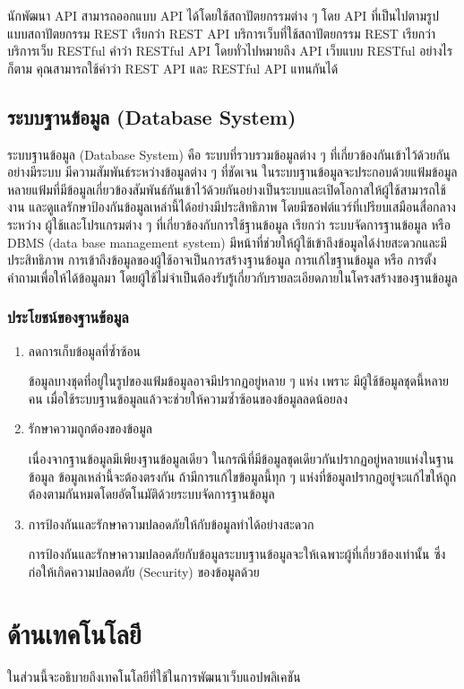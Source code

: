 นักพัฒนา API สามารถออกแบบ API ได้โดยใช้สถาปัตยกรรมต่าง ๆ โดย API ที่เป็นไปตามรูปแบบสถาปัตยกรรม REST เรียกว่า REST API บริการเว็บที่ใช้สถาปัตยกรรม REST เรียกว่าบริการเว็บ RESTful คำว่า RESTful API โดยทั่วไปหมายถึง API เว็บแบบ RESTful อย่างไรก็ตาม คุณสามารถใช้คำว่า REST API และ RESTful API แทนกันได้
\subsection{ระบบฐานข้อมูล (Database System)}
ระบบฐานข้อมูล (Database System) \cite{web:database} คือ ระบบที่รวบรวมข้อมูลต่าง ๆ ที่เกี่ยวข้องกันเข้าไว้ด้วยกันอย่างมีระบบ มีความสัมพันธ์ระหว่างข้อมูลต่าง ๆ ที่ชัดเจน ในระบบฐานข้อมูลจะประกอบด้วยแฟ้มข้อมูลหลายแฟ้มที่มีข้อมูลเกี่ยวข้องสัมพันธ์กันเข้าไว้ด้วยกันอย่างเป็นระบบและเปิดโอกาสให้ผู้ใช้สามารถใช้งาน
และดูแลรักษาป้องกันข้อมูลเหล่านี้ได้อย่างมีประสิทธิภาพ โดยมีซอฟต์แวร์ที่เปรียบเสมือนสื่อกลางระหว่าง
ผู้ใช้และโปรแกรมต่าง ๆ ที่เกี่ยวข้องกับการใช้ฐานข้อมูล เรียกว่า ระบบจัดการฐานข้อมูล หรือ DBMS (data base management system) มีหน้าที่ช่วยให้ผู้ใช้เข้าถึงข้อมูลได้ง่ายสะดวกและมีประสิทธิภาพ การเข้าถึงข้อมูลของผู้ใช้อาจเป็นการสร้างฐานข้อมูล การแก้ไขฐานข้อมูล หรือ การตั้งคำถามเพื่อให้ได้ข้อมูลมา โดยผู้ใช้ไม่จำเป็นต้องรับรู้เกี่ยวกับรายละเอียดภายในโครงสร้างของฐานข้อมูล
\subsubsection{ประโยชน์ของฐานข้อมูล}
\begin{enumerate}
    \item ลดการเก็บข้อมูลที่ซ้ำซ้อน

          ข้อมูลบางชุดที่อยู่ในรูปของแฟ้มข้อมูลอาจมีปรากฏอยู่หลาย ๆ แห่ง เพราะ มีผู้ใช้ข้อมูลชุดนี้หลายคน เมื่อใช้ระบบฐานข้อมูลแล้วจะช่วยให้ความซ้ำซ้อนของข้อมูลลดน้อยลง
    \item รักษาความถูกต้องของข้อมูล

          เนื่องจากฐานข้อมูลมีเพียงฐานข้อมูลเดียว ในกรณีที่มีข้อมูลชุดเดียวกันปรากฏอยู่หลายแห่งในฐานข้อมูล ข้อมูลเหล่านี้จะต้องตรงกัน ถ้ามีการแก้ไขข้อมูลนี้ทุก ๆ แห่งที่ข้อมูลปรากฏอยู่จะแก้ไขให้ถูกต้องตามกันหมดโดยอัตโนมัติด้วยระบบจัดการฐานข้อมูล
    \item การป้องกันและรักษาความปลอดภัยให้กับข้อมูลทำได้อย่างสะดวก

          การป้องกันและรักษาความปลอดภัยกับข้อมูลระบบฐานข้อมูลจะให้เฉพาะผู้ที่เกี่ยวข้องเท่านั้น
          ซึ่งก่อให้เกิดความปลอดภัย (Security) ของข้อมูลด้วย
\end{enumerate}
\section{ด้านเทคโนโลยี}
ในส่วนนี้จะอธิบายถึงเทคโนโลยีที่ใช้ในการพัฒนาเว็บแอปพลิเคชัน

